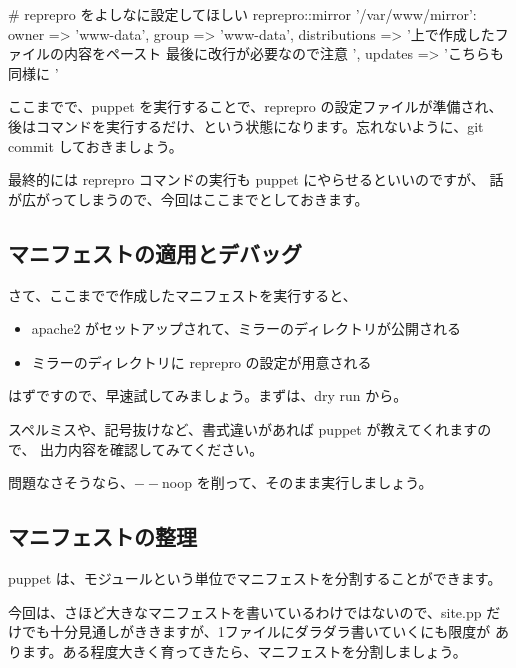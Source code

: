 \documentclass[mingoth,a4paper]{jsarticle}
\begin{document}
\begin{commandline}
# reprepro をよしなに設定してほしい
reprepro::mirror { '/var/www/mirror':
  owner => 'www-data', group => 'www-data',
  distributions => '上で作成したファイルの内容をペースト
最後に改行が必要なので注意
',
  updates       => 'こちらも同様に
'
}
\end{commandline}

ここまでで、puppet を実行することで、reprepro の設定ファイルが準備され、
後はコマンドを実行するだけ、という状態になります。忘れないように、git commit
しておきましょう。

最終的には reprepro コマンドの実行も puppet にやらせるといいのですが、
話が広がってしまうので、今回はここまでとしておきます。

\subsection{マニフェストの適用とデバッグ}

さて、ここまでで作成したマニフェストを実行すると、

\begin{itemize}
\item apache2 がセットアップされて、ミラーのディレクトリが公開される
\item ミラーのディレクトリに reprepro の設定が用意される
\end{itemize}

はずですので、早速試してみましょう。まずは、dry run から。


スペルミスや、記号抜けなど、書式違いがあれば puppet が教えてくれますので、
出力内容を確認してみてください。

問題なさそうなら、$--$noop を削って、そのまま実行しましょう。

\subsection{マニフェストの整理}

puppet は、モジュールという単位でマニフェストを分割することができます。

今回は、さほど大きなマニフェストを書いているわけではないので、site.pp
だけでも十分見通しがききますが、1ファイルにダラダラ書いていくにも限度が
あります。ある程度大きく育ってきたら、マニフェストを分割しましょう。
\end{document}
